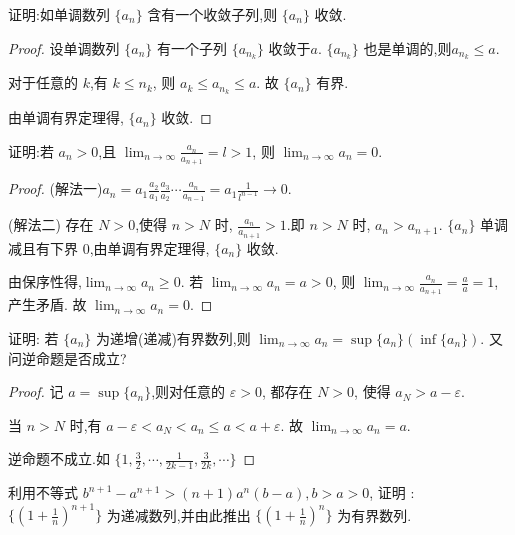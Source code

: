 \begin{practice}
    证明:如单调数列 $\{a_n\}$ 含有一个收敛子列,则 $\{a_n\}$ 收敛.
\end{practice}

\begin{proof}
    设单调数列 $\{a_n\}$ 有一个子列 $\{a_{n_k}\}$ 收敛于$a$.  $\{a_{n_k}\}$ 也是单调的,则$a_{n_k}\le a$.

    对于任意的 $k$,有 $k\le n_k$, 则 $a_k\le a_{n_k}\le a$. 故 $\{a_n\}$ 有界.

    由单调有界定理得, $\{a_n\}$ 收敛.
\end{proof}

\begin{practice}
    证明:若 $a_n>0$,且 $\lim_{n\to\infty} \frac{a_n}{a_{n+1}}=l>1$, 则 $\lim_{n\to\infty} a_n=0$.
\end{practice}

\begin{proof}
    (解法一)$a_n=a_1\frac{a_2}{a_1}\frac{a_3}{a_2}\cdots \frac{a_n}{a_{n-1}}=a_1\frac{1}{l^{n-1}}\to 0$.

    (解法二) 存在 $N>0$,使得 $n>N$ 时, $\frac{a_n}{a_{n+1}}>1$.即 $n>N$ 时, $a_n>a_{n+1}$. $\{a_n\}$ 单调减且有下界 $0$,由单调有界定理得, $\{a_n\}$ 收敛.

    由保序性得,$\lim_{n\to\infty} a_n\ge 0$. 若 $\lim_{n\to\infty} a_n=a>0$, 则 $\lim_{n\to\infty} \frac{a_n}{a_{n+1}}=\frac{a}{a}=1$,产生矛盾. 故 $\lim_{n\to\infty} a_n=0$.
\end{proof}

\begin{practice}
    证明: 若 $\{a_n\}$ 为递增(递减)有界数列,则 $\lim_{n\to\infty} a_n=\sup \{a_n\} (\inf \{a_n\}).$ 又问逆命题是否成立?
\end{practice}

\begin{proof}
    记 $a=\sup \{a_n\}$,则对任意的 $\varepsilon>0$, 都存在 $N>0$, 使得 $a_N>a-\varepsilon$.

    当 $n>N$ 时,有 $a-\varepsilon<a_N<a_n\le a<a+\varepsilon$. 故 $\lim_{n\to\infty} a_n=a$.

    逆命题不成立.如 $\{1,\frac{3}{2},\cdots,\frac{1}{2k-1},\frac{3}{2k},\cdots\}$
\end{proof}

\begin{practice}\label{prac:eee}
    利用不等式 $b^{n+1}-a^{n+1}>(n+1)a^n(b-a),b>a>0$, 证明 : $\{(1+\frac{1}{n})^{n+1}\}$ 为递减数列,并由此推出 $\{(1+\frac{1}{n})^n\}$ 为有界数列.
\end{practice}

